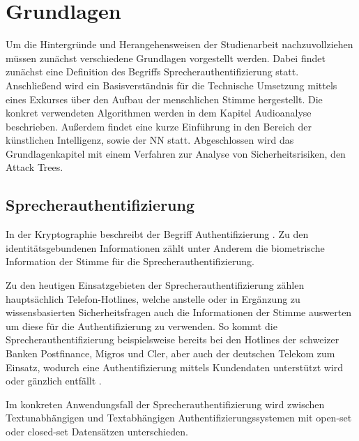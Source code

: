 \section{Grundlagen}
Um die Hintergründe und Herangehensweisen der Studienarbeit nachzuvollziehen müssen zunächst verschiedene Grundlagen vorgestellt werden.
Dabei findet zunächst eine Definition des Begriffs Sprecherauthentifizierung statt.
Anschließend wird ein Basisverständnis für die Technische Umsetzung mittels eines Exkurses über den Aufbau der menschlichen Stimme hergestellt.
Die konkret verwendeten Algorithmen werden in dem Kapitel Audioanalyse beschrieben.
Außerdem findet eine kurze Einführung in den Bereich der künstlichen Intelligenz, sowie der \ac{NN} statt.
Abgeschlossen wird das Grundlagenkapitel mit einem Verfahren zur Analyse von Sicherheitsrisiken, den Attack Trees.

\subsection{Sprecherauthentifizierung}
In der Kryptographie beschreibt der Begriff Authentifizierung  \autocite[][S. 129]{tsolkas_rollen_2017}.
Zu den identitätsgebundenen Informationen zählt unter Anderem die biometrische Information der Stimme für die Sprecherauthentifizierung.

Zu den heutigen Einsatzgebieten der Sprecherauthentifizierung zählen hauptsächlich Telefon-Hotlines, welche anstelle oder in Ergänzung zu wissensbasierten Sicherheitsfragen auch die Informationen der Stimme auswerten um diese für die Authentifizierung zu verwenden.
So kommt die Sprecherauthentifizierung beispielsweise bereits bei den Hotlines der schweizer Banken Postfinance, Migros und Cler, aber auch der deutschen Telekom zum Einsatz, wodurch eine Authentifizierung mittels Kundendaten unterstützt wird oder gänzlich entfällt \autocite[vgl.][]{anz_mit_2023} \autocite[vgl.][]{noauthor_authentifizierung_nodate} \autocite[vgl.][]{noauthor_meine_nodate}.

Im konkreten Anwendungsfall der Sprecherauthentifizierung wird zwischen Textunabhängigen und Textabhängigen Authentifizierungssystemen mit open-set oder closed-set Datensätzen unterschieden.

